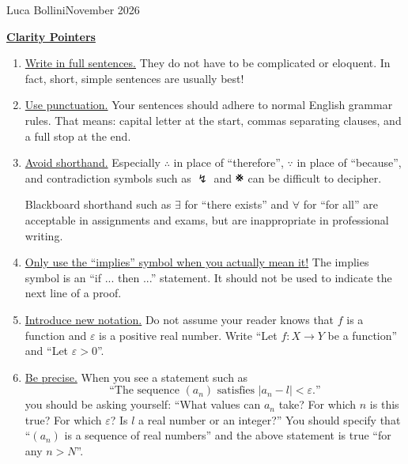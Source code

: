 \documentclass[12pt,a4paper]{article}
\newcommand{\thetitle}{Clarity Pointers}
\newcommand{\theauthor}{Luca Bollini}
\newcommand{\thedate}{November 2026}
\newcommand{\eps}{\varepsilon}
\newcommand{\contradiction}{%
\begin{tikzpicture}[rotate=45,x=0.5ex,y=0.5ex]
\draw[line width=.2ex] (0,2) -- (3,2) (0,1) -- (3,1) (1,3) -- (1,0) (2,3) -- (2,0);
\end{tikzpicture}
}
\begin{document}

\vspace{2mm}
{\sc  \theauthor}\hfill{\sc \thedate}

\vspace{3mm}

\begin{center}
{\large \textbf {\underline{\thetitle}}}
\end{center}

\vspace{3mm}

\begin{enumerate}
    \item \underline{Write in full sentences.} They do not have to be complicated or eloquent. In fact, short, simple sentences are usually best!

    \item \underline{Use punctuation.} Your sentences should adhere to normal English grammar rules. That means: capital letter at the start, commas separating clauses, and a full stop at the end.    

    \item \underline{Avoid shorthand.} Especially $\therefore$ in place of ``therefore'', $\because$ in place of ``because'', and contradiction symbols such as $\lightning$ and $\contradiction$ can be difficult to decipher. 
    
    Blackboard shorthand such as $\exists$ for ``there exists'' and $\forall$ for ``for all'' are acceptable in assignments and exams, but are inappropriate in professional writing.

    \item \underline{Only use the ``implies'' symbol when you actually mean it!} The implies symbol is an ``if ... then ...'' statement. It should not be used to indicate the next line of a proof.

    \item \underline{Introduce new notation.} Do not assume your reader knows that $f$ is a function and $\eps$ is a positive real number. Write ``Let $f:X\to Y$ be a function'' and ``Let $\eps>0$''.
    
    \item \underline{Be precise.} When you see a statement such as
    \[
    \text{``The sequence $(a_n)$ satisfies } |a_n - l|<\eps.\text{''}
    \]
    you should be asking yourself: ``What values can $a_n$ take? For which $n$ is this true? For which $\eps$? Is $l$ a real number or an integer?'' You should specify that ``$(a_n)$ is a sequence of real numbers'' and the above statement is true ``for any $n>N$''.


\end{enumerate}
\end{document}
